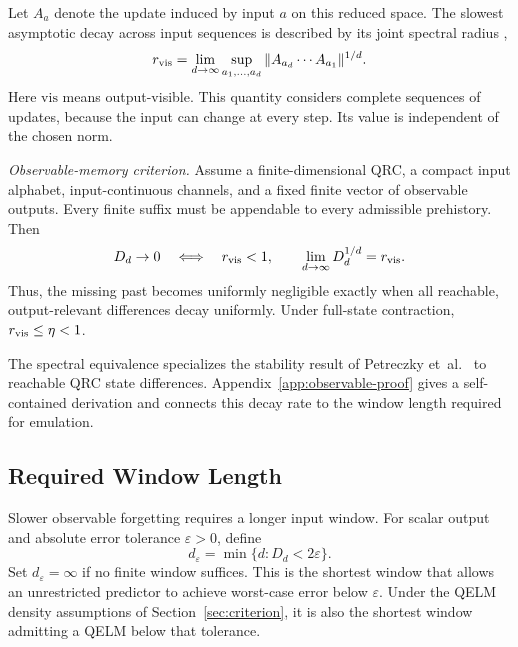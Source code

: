 Let $A_a$ denote the update induced by input $a$ on this reduced space.
The slowest asymptotic decay across input sequences is described by its
joint spectral radius \cite{rota1960joint,jungers2009joint},
\begin{equation}
 r_{\rm vis}
 =\lim_{d\to\infty}
 \sup_{a_1,\ldots,a_d}
 \|A_{a_d}\cdots A_{a_1}\|^{1/d}.
 \label{eq:visible-radius-definition}
\end{equation}
Here $\mathrm{vis}$ means output-visible. This quantity considers complete
sequences of updates, because the input can change at every step.
Its value is independent of the chosen norm.



\textit{Observable-memory criterion.} Assume a finite-dimensional QRC,
a compact input alphabet, input-continuous channels, and a fixed finite
vector of observable outputs. Every finite suffix must be appendable to
every admissible prehistory. Then
\begin{equation}
 D_d\to0\quad\Longleftrightarrow\quad r_{\rm vis}<1,
 \qquad
 \lim_{d\to\infty}D_d^{1/d}=r_{\rm vis}.
 \label{eq:visible-memory-theorem}
\end{equation}
Thus, the missing past becomes uniformly negligible exactly when all
reachable, output-relevant differences decay uniformly.
Under full-state contraction, $r_{\rm vis}\leq\eta<1$.

The spectral equivalence specializes the stability result of
Petreczky et~al.~\cite[Theorem~III.1]{petreczky2026stability} to reachable
QRC state differences. Appendix~\ref{app:observable-proof} gives a
self-contained derivation and connects this decay rate to the window
length required for emulation.

\subsection{Required Window Length}

Slower observable forgetting requires a longer input window. For scalar
output and absolute error tolerance $\varepsilon>0$, define
\begin{equation}
 d_\varepsilon=\min\{d:D_d<2\varepsilon\}.
 \label{eq:context-length}
\end{equation}
Set $d_\varepsilon=\infty$ if no finite window suffices.
This is the shortest window that allows an unrestricted predictor to
achieve worst-case error below $\varepsilon$. Under the QELM density
assumptions of Section~\ref{sec:criterion}, it is also the shortest window
admitting a QELM below that tolerance.

